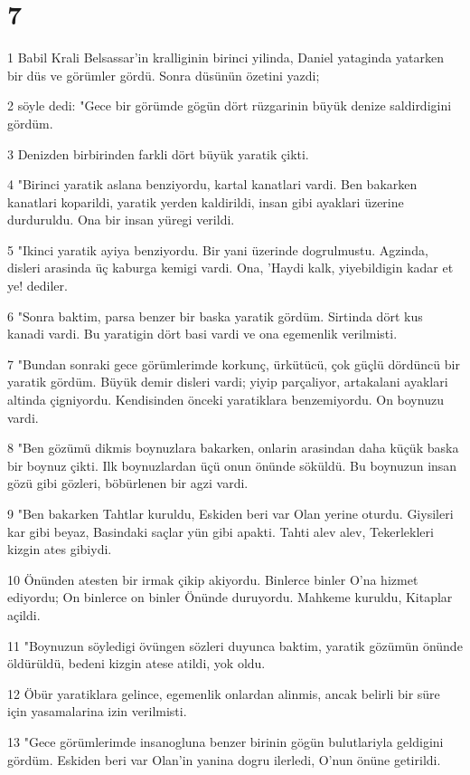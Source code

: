\chapter{7}

\par 1 Babil Krali Belsassar'in kralliginin birinci yilinda, Daniel yataginda yatarken bir düs ve görümler gördü. Sonra düsünün özetini yazdi;
\par 2 söyle dedi: "Gece bir görümde gögün dört rüzgarinin büyük denize saldirdigini gördüm.
\par 3 Denizden birbirinden farkli dört büyük yaratik çikti.
\par 4 "Birinci yaratik aslana benziyordu, kartal kanatlari vardi. Ben bakarken kanatlari koparildi, yaratik yerden kaldirildi, insan gibi ayaklari üzerine durduruldu. Ona bir insan yüregi verildi.
\par 5 "Ikinci yaratik ayiya benziyordu. Bir yani üzerinde dogrulmustu. Agzinda, disleri arasinda üç kaburga kemigi vardi. Ona, 'Haydi kalk, yiyebildigin kadar et ye! dediler.
\par 6 "Sonra baktim, parsa benzer bir baska yaratik gördüm. Sirtinda dört kus kanadi vardi. Bu yaratigin dört basi vardi ve ona egemenlik verilmisti.
\par 7 "Bundan sonraki gece görümlerimde korkunç, ürkütücü, çok güçlü dördüncü bir yaratik gördüm. Büyük demir disleri vardi; yiyip parçaliyor, artakalani ayaklari altinda çigniyordu. Kendisinden önceki yaratiklara benzemiyordu. On boynuzu vardi.
\par 8 "Ben gözümü dikmis boynuzlara bakarken, onlarin arasindan daha küçük baska bir boynuz çikti. Ilk boynuzlardan üçü onun önünde söküldü. Bu boynuzun insan gözü gibi gözleri, böbürlenen bir agzi vardi.
\par 9 "Ben bakarken Tahtlar kuruldu, Eskiden beri var Olan yerine oturdu. Giysileri kar gibi beyaz, Basindaki saçlar yün gibi apakti. Tahti alev alev, Tekerlekleri kizgin ates gibiydi.
\par 10 Önünden atesten bir irmak çikip akiyordu. Binlerce binler O'na hizmet ediyordu; On binlerce on binler Önünde duruyordu. Mahkeme kuruldu, Kitaplar açildi.
\par 11 "Boynuzun söyledigi övüngen sözleri duyunca baktim, yaratik gözümün önünde öldürüldü, bedeni kizgin atese atildi, yok oldu.
\par 12 Öbür yaratiklara gelince, egemenlik onlardan alinmis, ancak belirli bir süre için yasamalarina izin verilmisti.
\par 13 "Gece görümlerimde insanogluna benzer birinin gögün bulutlariyla geldigini gördüm. Eskiden beri var Olan'in yanina dogru ilerledi, O'nun önüne getirildi.
